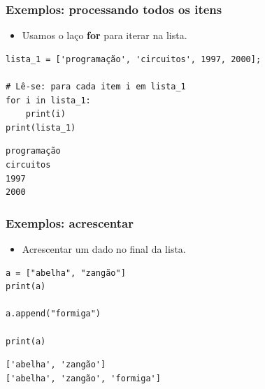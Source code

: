 \documentclass{beamer}
\begin{document}
\begin{frame}[fragile]
\frametitle{Exemplos: processando todos os itens}

\begin{itemize}
    \vfill \item Usamos o laço \textbf{for} para iterar na lista.
\end{itemize}

\vfill \begin{verbatim}
lista_1 = ['programação', 'circuitos', 1997, 2000];

# Lê-se: para cada item i em lista_1
for i in lista_1:
    print(i)
print(lista_1)

\end{verbatim}
    

\vfill \begin{verbatim}
programação
circuitos
1997
2000
\end{verbatim}

\end{frame}


\begin{frame}[fragile]
\frametitle{Exemplos: acrescentar}

\begin{itemize}
    \vfill \item Acrescentar um dado no final da lista.
\end{itemize}

\vfill \begin{verbatim}
a = ["abelha", "zangão"]
print(a)

a.append("formiga")

print(a)
\end{verbatim}
    

\vfill \begin{verbatim}
['abelha', 'zangão']
['abelha', 'zangão', 'formiga']
\end{verbatim}

\end{frame}
\end{document}
